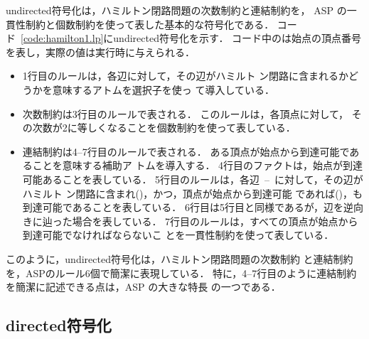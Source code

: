 \textsf{undirected}符号化は，ハミルトン閉路問題の次数制約と連結制約を，
ASP の一貫性制約と個数制約を使って表した基本的な符号化である．
コード~\ref{code:hamilton1.lp}に\textsf{undirected}符号化を示す．
コード中のは始点の頂点番号を表し，実際の値は実行時に与えられる．
\begin{itemize}
\item 1行目のルールは，各辺に対して，その辺がハミルト
  ン閉路に含まれるかどうかを意味するアトムを選択子を使っ
  て導入している．
\item 次数制約は3行目のルールで表される．
  このルールは，各頂点に対して，
  その次数が2に等しくなることを個数制約を使って表している．
\item 連結制約は4--7行目のルールで表される．
  ある頂点が始点から到達可能であることを意味する補助ア
  トムを導入する．
  4行目のファクトは，始点が到達可能あることを表している．
  5行目のルールは，各辺~--~に対して，その辺がハミルト
  ン閉路に含まれ()，かつ，頂点が始点から到達可能
  であれば()，も到達可能であることを表している．
  6行目は5行目と同様であるが，辺を逆向きに辿った場合を表している．
  7行目のルールは，すべての頂点が始点から到達可能でなければならないこ
  とを一貫性制約を使って表している．
\end{itemize}
このように，\textsf{undirected}符号化は，ハミルトン閉路問題の次数制約
と連結制約を，ASPのルール6個で簡潔に表現している．
特に，4--7行目のように連結制約を簡潔に記述できる点は，ASP の大きな特長
の一つである．

\subsection{\textsf{directed}符号化}



